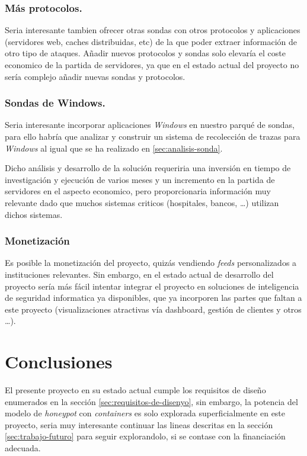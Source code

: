 \subsubsection{Más protocolos.}

Seria interesante tambien ofrecer otras sondas con otros protocolos y aplicaciones (servidores web, caches distribuidas, etc) de la que poder extraer información de otro
tipo de ataques. Añadir nuevos protocolos y sondas solo elevaría el coste economico de la partida de servidores, ya que en el estado actual del proyecto no sería 
complejo añadir nuevas sondas y protocolos.

\subsubsection{Sondas de Windows.}

Seria interesante incorporar aplicaciones \emph{Windows} en nuestro parqué de sondas, para ello habría que analizar y construir un sistema de recolección de trazas
para \emph{Windows} al igual que se ha realizado en \ref{sec:analisis-sonda}.

Dicho análisis y desarrollo de la solución requeriria una inversión en tiempo de investigación y ejecución de varios meses y un incremento en la partida de servidores en el aspecto economico, 
pero proporcionaria información muy relevante dado que muchos sistemas criticos (hospitales, bancos, \ldots) utilizan dichos sistemas.


\subsubsection{Monetización}

Es posible la monetización del proyecto, quizás vendiendo \emph{feeds} personalizados a instituciones relevantes. Sin embargo, en el estado actual de desarrollo del proyecto
sería más fácil intentar integrar el proyecto en soluciones de inteligencia de seguridad informatica ya disponibles, que ya incorporen las partes que faltan a este proyecto
(visualizaciones atractivas vía dashboard, gestión de clientes y otros \ldots).

\section{Conclusiones}

El presente proyecto en su estado actual cumple los requisitos de diseño enumerados en la sección \ref{sec:requisitos-de-disenyo}, sin embargo,
la potencia del modelo de \emph{honeypot} con \emph{containers} es solo explorada superficialmente en este proyecto, seria muy interesante continuar
las lineas descritas en la sección \ref{sec:trabajo-futuro} para seguir explorandolo, si se contase con la financiación adecuada.

